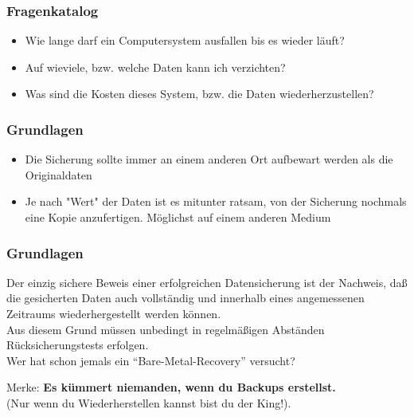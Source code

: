 \begin{frame}
  \frametitle{Fragenkatalog}
  \pause
  \begin{itemize}
    \item Wie lange darf ein Computersystem ausfallen bis es wieder läuft?
    \item Auf wieviele, bzw. welche Daten kann ich verzichten?
    \item Was sind die Kosten dieses System, bzw. die Daten wiederherzustellen?
  \end{itemize}
\end{frame}

\begin{frame}



  \frametitle{Grundlagen}
  \pause
  \begin{itemize}
    \item Die Sicherung sollte immer an einem anderen Ort aufbewart werden als die Originaldaten
    \item Je nach "Wert" der Daten ist es mitunter ratsam, von der Sicherung nochmals eine Kopie anzufertigen. Möglichst auf einem anderen Medium
  \end{itemize}
\end{frame}

\begin{frame}
  \frametitle{Grundlagen}
  \pause
  Der einzig sichere Beweis einer erfolgreichen Datensicherung ist der Nachweis, daß die gesicherten Daten auch vollständig und innerhalb eines angemessenen Zeitraums wiederhergestellt werden können.\\ \pause
  Aus diesem Grund müssen unbedingt in regelmäßigen Abständen Rücksicherungstests erfolgen.\\ \pause
  Wer hat schon jemals ein “Bare-Metal-Recovery” versucht?  \pause
  \begin{alertblock}{Merke:}
    {\bf Es kümmert niemanden, wenn du Backups erstellst.}\\(Nur wenn du Wiederherstellen kannst bist du der King!).
  \end{alertblock}
\end{frame}

